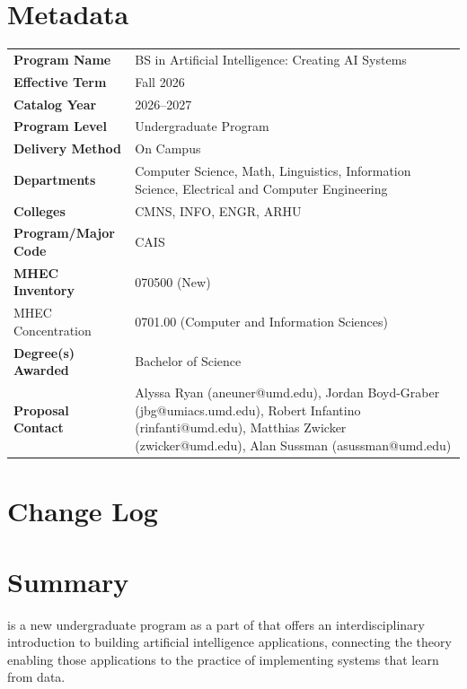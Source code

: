 \documentclass[
10pt, %
a4paper, %
oneside, %
headinclude,footinclude, %
BCOR5mm, %
]{scrartcl}
\begin{document}
\section{Metadata}

\begin{tabular}{lp{8cm}}
\toprule
\textbf{Program Name} & BS in Artificial Intelligence: Creating AI Systems \\
\textbf{Effective Term} & Fall 2026 \\
\textbf{Catalog Year} & 2026--2027 \\
\textbf{Program Level} & Undergraduate Program \\
\textbf{Delivery Method} & On Campus \\
\textbf{Departments} & Computer Science, Math, Linguistics, Information Science, Electrical and Computer Engineering \\
\textbf{Colleges} & CMNS, INFO, ENGR, ARHU \\
\textbf{Program/Major Code} & CAIS \\
\textbf{MHEC Inventory} & 070500 (New) \\
{MHEC Concentration} & 0701.00 (Computer and Information Sciences) \\  %
\textbf{Degree(s) Awarded} & Bachelor of Science \\
\textbf{Proposal Contact} & Alyssa Ryan (aneuner@umd.edu), Jordan Boyd-Graber (jbg@umiacs.umd.edu), Robert Infantino (rinfanti@umd.edu), Matthias Zwicker (zwicker@umd.edu), Alan Sussman (asussman@umd.edu)  \\
\bottomrule
\end{tabular}

\section{Change Log}




\section{Summary}

\name{} is a new undergraduate program as a part of \aim{} that offers an interdisciplinary introduction to building artificial intelligence applications, connecting the theory enabling those applications to the practice of implementing systems that learn from data.
\end{document}
